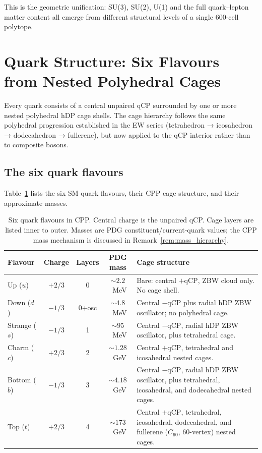 \documentclass[11pt,a4paper]{article}
\newcommand{\qCP}{\mathrm{qCP}}
\begin{document}
This is the geometric unification: SU(3), SU(2), U(1) and the full
quark--lepton matter content all emerge from different structural
levels of a single 600-cell polytope.

\section{Quark Structure: Six Flavours from Nested Polyhedral Cages}
\label{sec:quarks}

Every quark consists of a central unpaired qCP surrounded by one or
more nested polyhedral hDP cage shells.  The cage hierarchy follows
the same polyhedral progression established in the EW series
(tetrahedron → icosahedron → dodecahedron → fullerene), but now
applied to the qCP interior rather than to composite bosons.

\subsection{The six quark flavours}

Table~\ref{tab:quarks} lists the six SM quark flavours, their CPP
cage structure, and their approximate masses.

\begin{table}[H]
\centering
\caption{Six quark flavours in CPP.  Central charge is the
  unpaired qCP.  Cage layers are listed inner to outer.
  Masses are PDG constituent/current-quark values; the CPP mass
  mechanism is discussed in Remark~\ref{rem:mass_hierarchy}.}
\label{tab:quarks}
\begin{tabular}{@{}p{1.8cm}cccp{5.5cm}@{}}
\toprule
Flavour & Charge & Layers & PDG mass & Cage structure \\
\midrule
Up ($u$) & $+2/3$ & 0 & $\sim2.2$~MeV & Bare: central $+\qCP$,
  ZBW cloud only.  No cage shell. \\[4pt]
Down ($d$) & $-1/3$ & 0+osc & $\sim4.8$~MeV & Central $-\qCP$
  plus radial hDP ZBW oscillator; no polyhedral cage. \\[4pt]
Strange ($s$) & $-1/3$ & 1 & $\sim95$~MeV & Central $-\qCP$,
  radial hDP ZBW oscillator, plus tetrahedral cage. \\[4pt]
Charm ($c$) & $+2/3$ & 2 & $\sim1.28$~GeV & Central $+\qCP$,
  tetrahedral and icosahedral nested cages. \\[4pt]
Bottom ($b$) & $-1/3$ & 3 & $\sim4.18$~GeV & Central $-\qCP$,
  radial hDP ZBW oscillator, plus tetrahedral, icosahedral,
  and dodecahedral nested cages. \\[4pt]
Top ($t$) & $+2/3$ & 4 & $\sim173$~GeV & Central $+\qCP$,
  tetrahedral, icosahedral, dodecahedral, and fullerene
  ($C_{60}$, 60-vertex) nested cages. \\
\bottomrule
\end{tabular}
\end{table}
\end{document}
